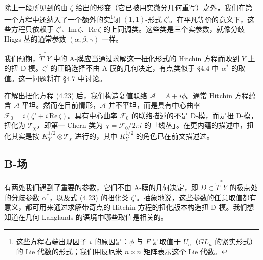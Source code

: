 \documentclass[11pt,a4paper]{article}
\begin{document}
除上一段所见到的由 $\zeta$ 给出的形变（它已被用实微分几何重写）之外，我们在第一个方程中还纳入了一个额外的实\footnote{这些方程右端出现因子 $i$ 的原因是：$\phi$ 与 $F$ 是取值于 $U_n$（$GL_n$ 的紧实形式）的 Lie 代数的形式；我们用反厄米 $n\times n$ 矩阵表示这个 Lie 代数。}闭 $(1,1)$-形式 $\zeta'$。在平凡等价的意义下，这些方程只依赖于 $\zeta'$、$\mathrm{Im}\,\zeta$、$\mathrm{Re}\,\zeta$ 的上同调类。这些类是三个实参数，就像分歧 Higgs 丛的通常参数 $(\alpha,\beta,\gamma)$ 一样。

我们预期，$\widetilde{T}^*Y$ 中的 A-膜应当通过求解这一扭化形式的 Hitchin 方程而映到 $Y$ 上的扭 D-模。$\zeta'$ 的正确选择不由 A-膜的几何决定，有点类似于 §4.4 中 $\alpha^*$ 的取值。这一问题将在 §4.7 中讨论。

在解出扭化方程 (4.23) 后，我们构造复值联络 $\mathcal{A}=A+i\phi$。通常 Hitchin 方程蕴含 $\mathcal{A}$ 平坦。然而在目前情形，$\mathcal{A}$ 并不平坦，而是具有中心曲率 $\mathcal{F}_0=i(\zeta'+i\,\mathrm{Re}\,\zeta)$。具有中心曲率 $\mathcal{F}_0$ 的联络描述的不是 D-模，而是扭 D-模，扭化为 $\mathcal{T}_\chi$，即第一 Chern 类为 $\chi=\mathcal{F}_0/2\pi i$ 的「线丛」。在更内蕴的描述中，扭化其实是按 $K_Y^{1/2}\otimes\mathcal{T}_\chi$ 进行的，其中 $K_Y^{1/2}$ 的角色已在前文描述过。




\subsection{B-场}

有两处我们遇到了重要的参数，它们不由 A-膜的几何决定，即 $D\subset\widetilde{T}^*Y$ 的极点处的分歧参数 $\alpha^*$，以及式 (4.23) 的扭化类 $\zeta'$。抽象地说，这些参数的任意取值都有意义，都可用来通过求解带奇点的 Hitchin 方程的扭化版本构造扭 D-模。我们想知道在几何 Langlands 的语境中哪些取值是相关的。
\end{document}
